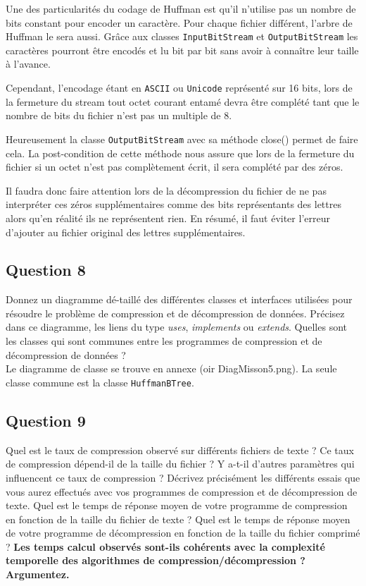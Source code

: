 \documentclass[11pt]{article}
\begin{document}
Une des particularités du codage de Huffman est qu'il n'utilise pas un nombre de bits constant pour encoder un caractère. Pour chaque fichier différent, l'arbre de Huffman le sera aussi. Grâce aux classes \verb+InputBitStream+ et \verb+OutputBitStream+ les caractères pourront être encodés et lu bit par bit sans avoir à connaître leur taille à l'avance.

Cependant, l'encodage étant en \verb+ASCII+ ou \verb+Unicode+ représenté sur 16 bits, lors de la fermeture du stream tout octet courant entamé devra être complété tant que le nombre de bits du fichier n'est pas un multiple de 8.

Heureusement la classe \verb+OutputBitStream+ avec sa méthode close() permet de faire cela. La post-condition de cette méthode nous assure que lors de la fermeture du fichier si un octet n'est pas complètement écrit, il sera complété par des zéros.

Il faudra donc faire attention lors de la décompression du fichier de ne pas interpréter ces zéros supplémentaires comme des bits représentants des lettres alors qu'en réalité ils ne représentent rien. En résumé, il faut éviter l'erreur d'ajouter au fichier original des lettres supplémentaires.

\subsection*{Question 8}
Donnez un diagramme dé-taillé des différentes classes et interfaces utilisées pour résoudre le problème de compression et de décompression de données. Précisez dans ce diagramme, les liens du type \textit{uses}, \textit{implements} ou \textit{extends}. Quelles sont les classes qui sont communes entre les programmes de compression et de décompression de données ? \\

Le diagramme de classe se trouve en annexe (oir DiagMisson5.png). La seule classe commune est la classe \verb+HuffmanBTree+.


\subsection*{Question 9}
Quel est le taux de compression observé sur différents fichiers de texte ? Ce taux de compression dépend-il de la taille du fichier ? Y a-t-il d'autres paramètres qui influencent ce taux de compression ? Décrivez précisément les différents essais que vous aurez effectués avec vos programmes de compression et de décompression de texte. Quel est le temps de réponse moyen de votre programme de compression en fonction de la taille du fichier de texte ? Quel est le temps de réponse moyen de votre
programme de décompression en fonction de la taille du fichier comprimé ? \textbf{Les temps calcul observés sont-ils cohérents avec la complexité temporelle des algorithmes de compression/décompression ? Argumentez.} \\
\end{document}
